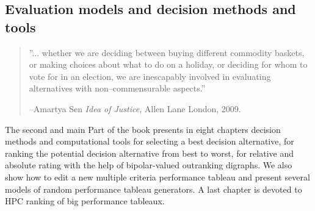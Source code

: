 % 
%
%

\begin{partbacktext}
  \part{Evaluation models and decision methods and tools}

  \begin{quotation}''... whether we are deciding between buying different commodity baskets, or making choices about what to do on a holiday, or deciding for whom to vote for in an election, we are inescapably involved in evaluating alternatives with non–commensurable aspects.''
    
    --Amartya Sen \emph{Idea of Justice}, Allen Lane London, 2009.
  \end{quotation}

  \vspace{1cm}
  \noindent The second and main Part of the book presents in eight chapters decision methods and computational tools for selecting a best decision alternative, for ranking the potential decision alternative from best to worst, for relative and absolute rating with the help of bipolar-valued outranking digraphs. We also show how to edit a new multiple criteria performance tableau and present several models of random performance tableau generators. A last chapter is devoted to HPC ranking of big performance tableaux.
\end{partbacktext}